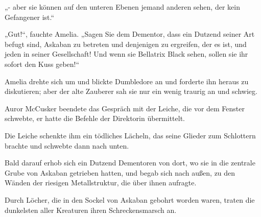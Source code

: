 „- aber sie können auf den unteren Ebenen jemand anderen sehen, der kein Gefangener ist.“

„Gut!“, fauchte Amelia. „Sagen Sie dem Dementor, dass ein Dutzend seiner Art befugt sind, Askaban zu betreten und denjenigen zu ergreifen, der es ist, und jeden in seiner Gesellschaft! Und wenn sie Bellatrix Black sehen, sollen sie ihr sofort den Kuss geben!“

Amelia drehte sich um und blickte Dumbledore an und forderte ihn heraus zu diskutieren; aber der alte Zauberer sah sie nur ein wenig traurig an und schwieg.

\later

Auror McCusker beendete das Gespräch mit der Leiche, die vor dem Fenster schwebte, er hatte die Befehle der Direktorin übermittelt.

Die Leiche schenkte ihm ein tödliches Lächeln, das seine Glieder zum Schlottern brachte und schwebte dann nach unten.

Bald darauf erhob sich ein Dutzend Dementoren von dort, wo sie in die zentrale Grube von Askaban getrieben hatten, und begab sich nach außen, zu den Wänden der riesigen Metallstruktur, die über ihnen aufragte.

Durch Löcher, die in den Sockel von Askaban gebohrt worden waren, traten die dunkelsten aller Kreaturen ihren Schreckensmarsch an.

